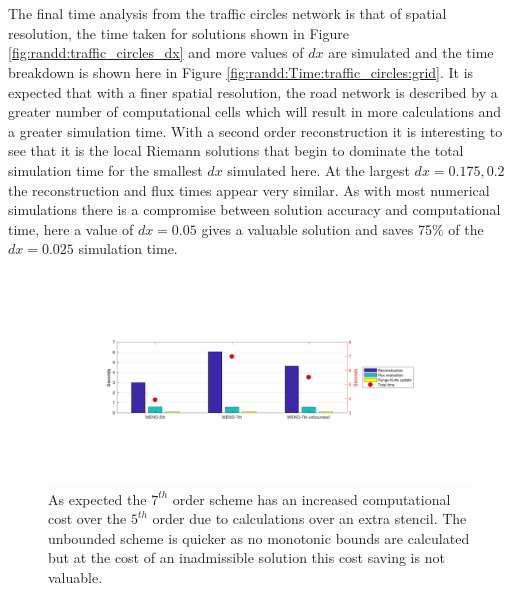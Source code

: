 	\\ \\
	The final time analysis from the traffic circles network is that of spatial resolution, the time taken for solutions shown in Figure \ref{fig:randd:traffic_circles_dx} and more values of $dx$ are simulated and the time breakdown is shown here in Figure \ref{fig:randd:Time:traffic_circles:grid}. It is expected that with a finer spatial resolution, the road network is described by a greater number of computational cells which will result in more calculations and a greater simulation time. With a second order reconstruction it is interesting to see that it is the local Riemann solutions that begin to dominate the total simulation time for the smallest $dx$ simulated here. At the largest $dx=0.175,0.2$ the reconstruction and flux times appear very similar. As with most numerical simulations there is a compromise between solution accuracy and computational time, here a value of $dx=0.05$ gives a valuable solution and saves 75\% of the $dx=0.025$ simulation time. 
	
	\newpage
	
	\begin{figure}[H]
    		\centering
        		\includegraphics[trim=140 160 138 160,clip,width=\textwidth]{Time_SingleRoad_W7.pdf}
		\caption[Time Analysis : ]{As expected the $7^{th}$ order scheme has an increased computational cost over the $5^{th}$ order due to calculations over an extra stencil. The unbounded scheme is quicker as no monotonic bounds are calculated but at the cost of an inadmissible solution this cost saving is not valuable.}
		\label{fig:randd:Time:SingleRoadW7}
	\end{figure}
	
